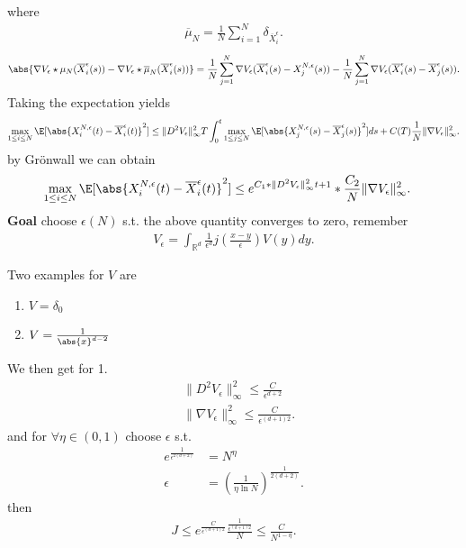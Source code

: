 where 
\begin{align*}
  \overline{\mu}_N = \frac{1}{N} \sum_{i=1}^{N}   \delta_{\overline{X}_i^{\epsilon}  }
.\end{align*}
\begin{align*}
  \abs{\nabla V_\epsilon \star  \mu_N(\overline{X}_i^{\epsilon}(s)) - \nabla V_{\epsilon} \star  \overline{\mu }_N(\overline{X}_i^{\epsilon}(s)  ) } = \frac{1}{N}\sum_{j=1}^{N} \nabla V_\epsilon(\overline{X}_i^{\epsilon}(s) - X_j^{N,\epsilon}(s)   )  - \frac{1}{N}\sum_{j=1}^{N} \nabla V_{\epsilon}(\overline{X}_i^{\epsilon}(s)-\overline{X}_j^{\epsilon}(s)    ) 
.\end{align*}
Taking the expectation yields 
\begin{align*}
  \max_{1 \le i \le N}\E[\abs{X_i^{N,\epsilon}(t) - \overline{X}_{i}^{\epsilon}(t)}^2  ]\le \|D^2 V_{\epsilon}\|_{\infty}^2 T \int_0^{t}  \max_{1\le j\le N} \E[\abs{X_j^{N,\epsilon}(s) - \overline{X}_j^{\epsilon}(s)  }^2] ds + C(T)\frac{1}{N}\|\nabla V_\epsilon\|_{\infty}^2
.\end{align*}
by Grönwall we can obtain 
\begin{align*}
  \max_{1 \le i \le N}\E[\abs{X_i^{N,\epsilon}(t) - \overline{X}_{i}^{\epsilon}(t)}^2  ] &\le e^{C_{1} * \|D^2 V_{\epsilon}\|_{\infty}^2 t+1} *\frac{C_{2}}{N}\|\nabla V_\epsilon\|^2_{\infty}
.\end{align*}
\textbf{Goal} choose $\epsilon(N)$ s.t. the above quantity converges to zero, remember 
\begin{align*}
  V_\epsilon = \int_{\mathbb{R}^{d} }\frac{1}{\epsilon^d}j(\frac{x-y}{\epsilon})V(y) dy
.\end{align*}
\begin{example}
 Two examples for $V$ are 
 \begin{enumerate}
   \item $V= \delta_0$
    \item $V = \frac{1}{\abs{x}^{d-2} }$
 \end{enumerate}
\end{example}
\begin{remark}
  We then get  for 1.
 \begin{align*}
  &\|D^2 V_{\epsilon}\|_{\infty}^2 \le  \frac{C}{\epsilon^{d+2}}\\
  &\|\nabla V_{\epsilon}\|_{\infty}^2 \le  \frac{C}{\epsilon ^{(d+1)2} }
 .\end{align*}
 and  for $ \forall \eta  \in  (0,1)$ choose $\epsilon$ s.t.
 \begin{align*}
   e^{\frac{1}{\epsilon ^{2(d+2)} }} &= N^{\eta} \\
   \epsilon &= (\frac{1}{\eta  \ln  N})^{\frac{1}{2(d+2)}}  
 .\end{align*}
 then 
 \begin{align*}
  J \le  e^{\frac{C}{\epsilon ^{(d+1)2} }} \frac{\frac{1}{\epsilon ^{(d+1)2} }}{N}  \le \frac{C}{N^{1-\eta } }
 .\end{align*}
\end{remark}

